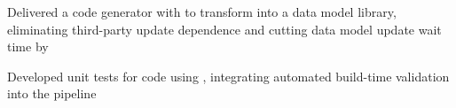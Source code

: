 
\begin{bullets}
		\item Delivered a code generator with  to transform  into a  data model library, eliminating third-party update dependence and cutting data model update wait time by 

		\item Developed unit tests for  code using , integrating automated build-time validation into the  pipeline
\end{bullets}
